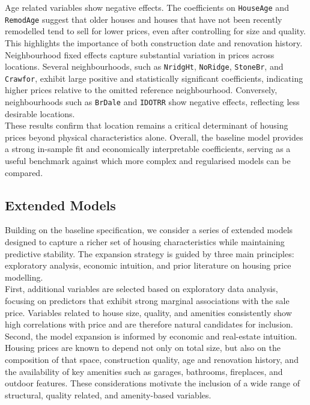 \documentclass[12pt,oneside]{article} %
\begin{document}
\noindent
Age related variables show negative effects.
The coefficients on \texttt{HouseAge} and  \texttt{RemodAge} suggest that older houses and houses that have not been recently remodelled tend to sell for lower prices, even after controlling for size and quality.
This highlights the importance of both construction date and renovation history.\\

\noindent
Neighbourhood fixed effects capture substantial variation in prices across locations. Several neighbourhoods, such as \texttt{NridgHt}, \texttt{NoRidge}, \texttt{StoneBr}, and \texttt{Crawfor}, exhibit large positive and statistically significant coefficients, indicating higher prices relative to the omitted reference neighbourhood.
Conversely, neighbourhoods such as \texttt{BrDale} and \texttt{IDOTRR} show negative effects, reflecting less desirable locations.\\

\noindent
These results confirm that location remains a critical determinant of housing prices beyond physical characteristics alone. Overall, the baseline model provides a strong in-sample fit and economically interpretable coefficients, serving as a useful benchmark against which more complex and regularised models can be compared.


\subsection{Extended Models}

Building on the baseline specification, we consider a series of extended models designed to capture a richer set of housing characteristics while maintaining predictive stability. The expansion strategy is guided by three main principles: exploratory analysis, economic intuition, and prior literature on housing price modelling.\\

\noindent
First, additional variables are selected based on exploratory data analysis, focusing on predictors that exhibit strong marginal associations with the sale price. Variables related to house size, quality, and amenities consistently show high correlations with price and are therefore natural candidates for inclusion.\\

\noindent
Second, the model expansion is informed by economic and real-estate intuition. Housing prices are known to depend not only on total size, but also on the composition of that space, construction quality, age and renovation history, and the availability of key amenities such as garages, bathrooms, fireplaces, and outdoor features. These considerations motivate the inclusion of a wide range of structural, quality related, and amenity-based variables.\\
\end{document}
